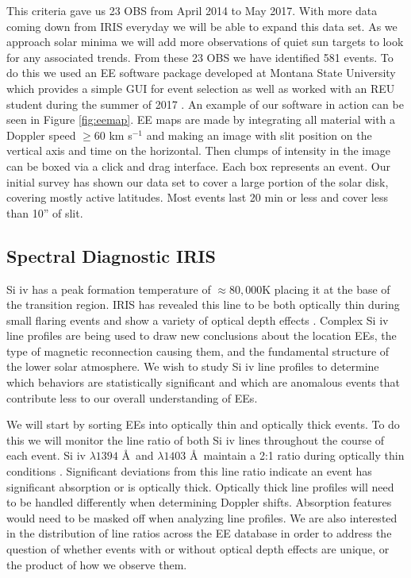\documentclass[]{aastex6}
\begin{document}
	This criteria gave us 23 OBS from April 2014 to May 2017.  With more data coming down from IRIS everyday we will be able to expand this data set.  As we approach solar minima we will add more observations of quiet sun targets to look for any associated trends.  From these 23 OBS we have identified 581 events.  To do this we used an EE software package developed at Montana State University which provides a simple GUI for event selection as well as worked with an REU student during the summer of 2017 \citep{Bartz2018}.  An example of our software in action can be seen in Figure \ref{fig:eemap}.  EE maps are made by integrating all material with a Doppler speed $\geq60$ km s$^{-1}$ and making an image with slit position on the vertical axis and time on the horizontal.  Then clumps of intensity in the image can be boxed via a click and drag interface.  Each box represents an event. Our initial survey has shown our data set to cover a large portion of the solar disk, covering mostly active latitudes.  Most events last 20 min or less and cover less than 10'' of slit.
	

	
	\subsection{Spectral Diagnostic IRIS}
	Si {\sc iv} has a peak formation temperature of $\approx 80,000$K placing it at the base of the transition region.  IRIS has revealed this line to be both optically thin during small flaring events and show a variety of optical depth effects \citep{Peter2014,Yan2015}.  Complex Si {\sc iv} line profiles are being used to draw new conclusions about the location EEs, the type of magnetic reconnection causing them, and the fundamental structure of the lower solar atmosphere.  We wish to study Si {\sc iv} line profiles to determine which behaviors are statistically significant and which are anomalous events that contribute less to our overall understanding of EEs.
	
	We will start by sorting EEs into optically thin and optically thick events. To do this we will monitor the line ratio of both Si {\sc iv} lines throughout the course of each event.  Si {\sc iv} $\lambda 1394$ \AA \ and $\lambda 1403$ \AA \  maintain a 2:1 ratio during optically thin conditions  \citep{Mathioudakis1999}.  Significant deviations from this line ratio indicate an event has significant absorption or is optically thick.  Optically thick line profiles will need to be handled differently when determining Doppler shifts.  Absorption features would need to be masked off when analyzing line profiles. We are also interested in the distribution of line ratios across the EE database in order to address the question of whether events with or without optical depth effects are unique, or the product of how we observe them.
	
\end{document}
